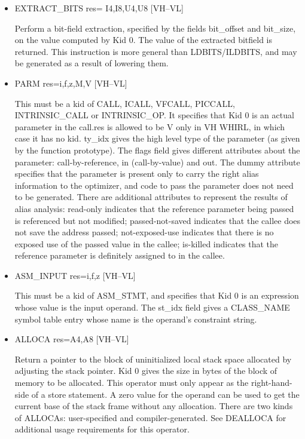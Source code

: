 \documentclass{article}
\begin{document}
\begin{itemize}
\item  EXTRACT\_BITS res= I4,I8,U4,U8 \hfill [VH--VL]

Perform a bit-field extraction, specified by the fields bit\_offset
and bit\_size, on the value computed by Kid 0. The value of the
extracted bitfield is returned. This instruction is more general
than LDBITS/ILDBITS, and may be generated as a result of lowering
them.


\item  PARM res=i,f,z,M,V \hfill [VH--VL]

This must be a kid of CALL, ICALL, VFCALL, PICCALL, INTRINSIC\_CALL or
INTRINSIC\_OP. It specifies that Kid 0 is an actual parameter in
the call.res is allowed to be V only in VH WHIRL, in which case it
has no kid.
ty\_idx gives the high level type of the parameter (as given by the
function prototype). The flags field gives different attributes
about the parameter: call-by-reference, in (call-by-value) and out.
The dummy attribute specifies that the parameter is present only
to carry the right alias information to the optimizer, and code to
pass the parameter does not need to be generated. There are
additional attributes to represent the results of alias analysis:
read-only indicates that the reference parameter being passed
is referenced but not modified; passed-not-saved indicates that the
callee does not save the address passed; not-exposed-use indicates
that there is no exposed use of the passed value in the callee;
is-killed indicates that the reference parameter is definitely
assigned to in the callee. 

\item  ASM\_INPUT res=i,f,z \hfill [VH--VL]

This must be a kid of ASM\_STMT, and specifies that Kid 0 is an
expression whose value is the input operand. The st\_idx field
gives a CLASS\_NAME symbol table entry whose name is the operand's constraint
string.

\item  ALLOCA res=A4,A8 \hfill [VH--VL]

Return a pointer to the block of uninitialized local stack space
allocated by adjusting the stack pointer. Kid 0 gives the size in
bytes of the block of
memory to be allocated. This operator must only appear as the
right-hand-side of a store statement. A zero value for the operand
can be used to get the current base of the stack frame without any
allocation. There are two kinds of
ALLOCAs: user-specified and compiler-generated. See DEALLOCA for
additional usage requirements for this operator.

\end{itemize}
\end{document}
